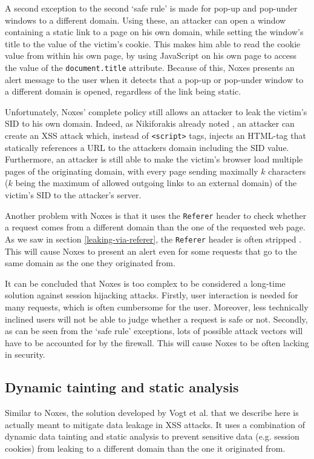 A second exception to the second `safe rule' is made for pop-up and pop-under windows to a different domain. Using these, an attacker can open a window containing a static link to a page on his own domain, while setting the window's title to the value of the victim's cookie. This makes him able to read the cookie value from within his own page, by using JavaScript on his own page to access the value of the \texttt{document.title} attribute. Because of this, Noxes presents an alert message to the user when it detects that a pop-up or pop-under window to a different domain is opened, regardless of the link being static.

Unfortunately, Noxes' complete policy still allows an attacker to leak the victim's SID to his own domain. Indeed, as Nikiforakis already noted \cite{Nikiforakis2010}, an attacker can create an XSS attack which, instead of \texttt{<script>} tags, injects an HTML-tag that statically references a URL to the attackers domain including the SID value. Furthermore, an attacker is still able to make the victim's browser load multiple pages of the originating domain, with every page sending maximally $k$ characters ($k$ being the maximum of allowed outgoing links to an external domain) of the victim's SID to the attacker's server.

Another problem with Noxes is that it uses the \texttt{Referer} header to check whether a request comes from a different domain than the one of the requested web page. As we saw in section \ref{leaking-via-referer}, the \texttt{Referer} header is often stripped \cite{Barth2008}. This will cause Noxes to present an alert even for some requests that go to the same domain as the one they originated from.

It can be concluded that Noxes is too complex to be considered a long-time solution against session hijacking attacks. Firstly, user interaction is needed for many requests, which is often cumbersome for the user. Moreover, less technically inclined users will not be able to judge whether a request is safe or not. Secondly, as can be seen from the `safe rule' exceptions, lots of possible attack vectors will have to be accounted for by the firewall. This will cause Noxes to be often lacking in security.

\subsection{Dynamic tainting and static analysis}

Similar to Noxes, the solution developed by Vogt et al. \cite{Vogt2007} that we describe here is actually meant to mitigate data leakage in XSS attacks. It uses a combination of dynamic data tainting and static analysis to prevent sensitive data (e.g. session cookies) from leaking to a different domain than the one it originated from.

